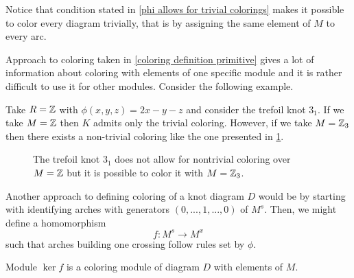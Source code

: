 Notice that condition stated in \cref{phi allows for trivial colorings} makes it possible to color every diagram trivially, that is by assigning the same element of $M$ to every arc.

Approach to coloring taken in \cref{coloring definition primitive} gives a lot of information about coloring with elements of one specific module and it is rather difficult to use it for other modules. Consider the following example.

\begin{example}
  Take $R=\operatorname{\mathbb{Z}}$ with $\phi(x, y, z)=2x-y-z$ and consider the trefoil knot $3_1$. If we take $M=\operatorname{\mathbb{Z}}$ then $K$ admits only the trivial coloring. However, if we take $M=\operatorname{\mathbb{Z}}_3$ then there exists a non-trivial coloring like the one presented in \cref{trefoil knot diagram 1}.
  \begin{figure}[h]\centering
 \caption{The trefoil knot $3_1$ does not allow for nontrivial coloring over $M=\operatorname{\mathbb{Z}}$ but it is possible to color it with $M=\operatorname{\mathbb{Z}}_3$.\label{trefoil knot diagram 1}}
\end{figure}
\end{example}

Another approach to defining coloring of a knot diagram $D$ would be by starting with identifying arches with generators $(0,..., 1, ..., 0)$ of $M^s$. Then, we might define a homomorphism
$$f:M^s\to M^x$$
such that arches building one crossing follow rules set by $\phi$.


\begin{definition}\label{coloring definition as kernel}
  Module $\ker f$ is a coloring module of diagram $D$ with elements of $M$.
\end{definition}

